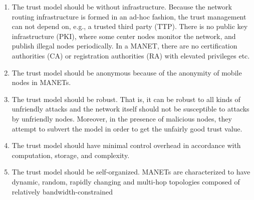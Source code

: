 \begin{enumerate}
  \item The trust model should be without infrastructure. Because the network routing infrastructure is formed in an ad-hoc fashion, the trust management can not depend on, e.g., a trusted third party (TTP). There is no public key infrastructure (PKI), where some center nodes monitor the network, and publish illegal nodes periodically. In a MANET, there are no certification authorities (CA) or registration authorities (RA) with elevated privileges etc.
  \item The trust model should be anonymous because of the anonymity of mobile nodes in MANETs.
  \item The trust model should be robust. That is, it can be robust to all kinds of unfriendly attacks and the network itself should not be susceptible to attacks by unfriendly nodes. Moreover, in the presence of malicious nodes, they attempt to subvert the model in order to get the unfairly good trust value.
  \item The trust model should have minimal control overhead in accordance with computation, storage, and complexity.
  \item The trust model should be self-organized. MANETs are characterized to have dynamic, random, rapidly changing and multi-hop topologies composed of relatively bandwidth-constrained
\end{enumerate}
